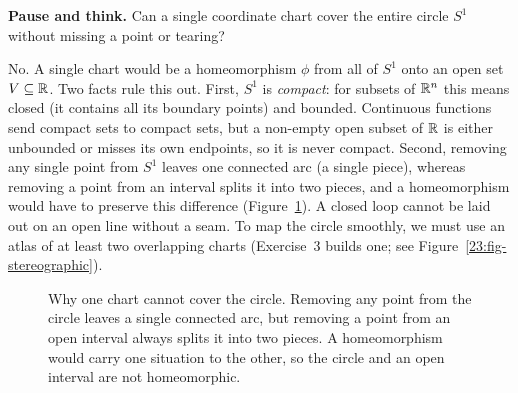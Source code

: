 \begin{intuitionbox}
\textbf{Pause and think.} Can a single coordinate chart cover the entire circle $S^1$ without missing a point or tearing?

No. A single chart would be a homeomorphism $\phi$ from all of $S^1$ onto an open set $V \subseteq \mathbb{R}$. Two facts rule this out. First, $S^1$ is \emph{compact}: for subsets of $\mathbb{R}^n$ this means closed (it contains all its boundary points) and bounded. Continuous functions send compact sets to compact sets, but a non-empty open subset of $\mathbb{R}$ is either unbounded or misses its own endpoints, so it is never compact. Second, removing any single point from $S^1$ leaves one connected arc (a single piece), whereas removing a point from an interval splits it into two pieces, and a homeomorphism would have to preserve this difference (Figure~\ref{23:fig-circle-one-chart}). A closed loop cannot be laid out on an open line without a seam. To map the circle smoothly, we must use an atlas of at least two overlapping charts (Exercise~3 builds one; see Figure~\ref{23:fig-stereographic}).
\end{intuitionbox}

\begin{figure}[htbp]
\centering
{}
\caption{Why one chart cannot cover the circle. Removing any point from the circle leaves a single connected arc, but removing a point from an open interval always splits it into two pieces. A homeomorphism would carry one situation to the other, so the circle and an open interval are not homeomorphic.}\label{23:fig-circle-one-chart}
\end{figure}

